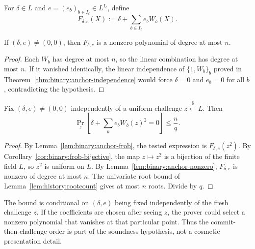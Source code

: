 \begin{definition}\label{def:binary:anchor-residual}
For $\delta\in L$ and $e=(e_b)_{b\in I_\ell}\in L^{I_\ell}$,
define
\[
 F_{\delta,e}(X):=\delta+\sum_{b\in I_\ell}e_bW_b(X).
\]
\end{definition}

\begin{lemma}\label{lem:binary:anchor-nonzero}
If $(\delta,e)\neq(0,0)$, then
$F_{\delta,e}$ is a nonzero polynomial of degree at most $n$.
\end{lemma}
\begin{proof}
Each $W_b$ has degree at most $n$,
so the linear combination has degree at most $n$.
If it vanished identically, the linear independence
of $\{1,W_b\}_b$ proved in
Theorem~\ref{thm:binary:anchor-independence}
would force $\delta=0$ and $e_b=0$ for all $b$,
contradicting the hypothesis.
\end{proof}

\begin{theorem}\label{thm:binary:anchor-root}
Fix $(\delta,e)\neq(0,0)$ independently of a uniform
challenge $z\overset{\$}{\leftarrow}L$. Then
\[
 \boxed{\Pr_z\left[
 \delta+\sum_be_bW_b(z)^2=0\right]\leq\frac{n}{q}.}
\]
\end{theorem}
\begin{proof}
By Lemma~\ref{lem:binary:anchor-frob},
the tested expression is $F_{\delta,e}(z^2)$.
By Corollary~\ref{cor:binary:frob-bijective},
the map $z\mapsto z^2$ is a bijection of the finite
field $L$, so $z^2$ is uniform on $L$.
By Lemma~\ref{lem:binary:anchor-nonzero},
$F_{\delta,e}$ is nonzero of degree at most $n$.
The univariate root bound of
Lemma~\ref{lem:history:rootcount} gives at most $n$
roots. Divide by $q$.
\end{proof}

\begin{remark}
The bound is conditional on $(\delta,e)$ being
fixed independently of the fresh challenge $z$.
If the coefficients are chosen after seeing $z$,
the prover could select a nonzero polynomial
that vanishes at that particular point.
Thus the commit-then-challenge order is part
of the soundness hypothesis, not a cosmetic
presentation detail.
\end{remark}
